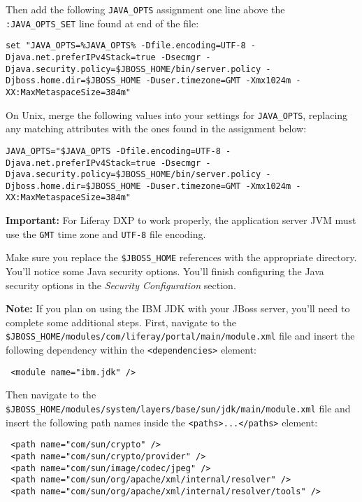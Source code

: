 Then add the following \texttt{JAVA\_OPTS} assignment one line above the
\texttt{:JAVA\_OPTS\_SET} line found at end of the file:

\begin{verbatim}
set "JAVA_OPTS=%JAVA_OPTS% -Dfile.encoding=UTF-8 -Djava.net.preferIPv4Stack=true -Dsecmgr -Djava.security.policy=$JBOSS_HOME/bin/server.policy -Djboss.home.dir=$JBOSS_HOME -Duser.timezone=GMT -Xmx1024m -XX:MaxMetaspaceSize=384m"
\end{verbatim}

On Unix, merge the following values into your settings for
\texttt{JAVA\_OPTS}, replacing any matching attributes with the ones
found in the assignment below:

\begin{verbatim}
JAVA_OPTS="$JAVA_OPTS -Dfile.encoding=UTF-8 -Djava.net.preferIPv4Stack=true -Dsecmgr -Djava.security.policy=$JBOSS_HOME/bin/server.policy -Djboss.home.dir=$JBOSS_HOME -Duser.timezone=GMT -Xmx1024m -XX:MaxMetaspaceSize=384m"
\end{verbatim}

\noindent\hrulefill

\textbf{Important:} For Liferay DXP to work properly, the application
server JVM must use the \texttt{GMT} time zone and \texttt{UTF-8} file
encoding.

\noindent\hrulefill

Make sure you replace the \texttt{\$JBOSS\_HOME} references with the
appropriate directory. You'll notice some Java security options. You'll
finish configuring the Java security options in the \emph{Security
Configuration} section.

\noindent\hrulefill

\textbf{Note:} If you plan on using the IBM JDK with your JBoss server,
you'll need to complete some additional steps. First, navigate to the
\texttt{\$JBOSS\_HOME/modules/com/liferay/portal/main/module.xml} file
and insert the following dependency within the
\texttt{\textless{}dependencies\textgreater{}} element:

\begin{verbatim}
 <module name="ibm.jdk" />
\end{verbatim}

Then navigate to the
\texttt{\$JBOSS\_HOME/modules/system/layers/base/sun/jdk/main/module.xml}
file and insert the following path names inside the
\texttt{\textless{}paths\textgreater{}...\textless{}/paths\textgreater{}}
element:

\begin{verbatim}
 <path name="com/sun/crypto" />
 <path name="com/sun/crypto/provider" />
 <path name="com/sun/image/codec/jpeg" />
 <path name="com/sun/org/apache/xml/internal/resolver" />
 <path name="com/sun/org/apache/xml/internal/resolver/tools" />
\end{verbatim}

